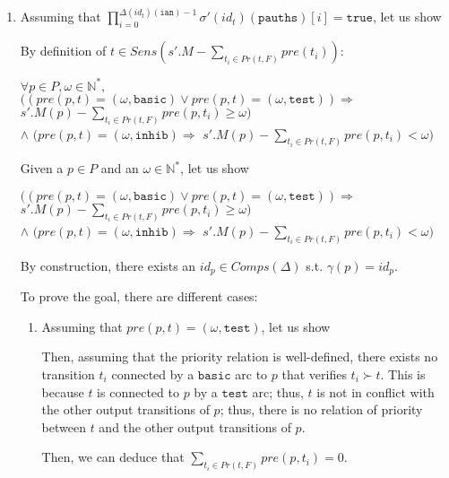 \documentclass[dvipsnames,12pt]{article}
\begin{document}
\begin{niproof}
\begin{enumerate}
  \item Assuming that
    $\prod\limits_{i=0}^{\Delta(id_t)(\texttt{ian})-1}\sigma'(id_t)(\texttt{pauths})[i]=\mathtt{true}$,
    let us show\\
    
    By definition of $t\in{}Sens(s'.M-\sum\limits_{t_i\in{}Pr(t,F)}pre(t_i))$:

    \begin{frameb}
      $\forall{}p\in{}P,\omega\in\mathbb{N}^{*},~$\\
      $\big((pre(p,t)=(\omega,\mathtt{basic})\lor{}pre(p,t)=(\omega,\mathtt{test}))\Rightarrow$
      ${}s'.M(p)-\sum\limits_{t_i\in{}Pr(t,F)}pre(p,t_i)\ge\omega\big)$\\
      $\land{}$ $\big(pre(p,t)=(\omega,\mathtt{inhib})\Rightarrow$
      ${}s'.M(p)-\sum\limits_{t_i\in{}Pr(t,F)}pre(p,t_i)<\omega\big)$
    \end{frameb}

    Given a $p\in{}P$ and an $\omega\in{}\mathbb{N}^{*}$, let us show 
    \begin{frameb}
      $\big((pre(p,t)=(\omega,\mathtt{basic})\lor{}pre(p,t)=(\omega,\mathtt{test}))\Rightarrow$
      ${}s'.M(p)-\sum\limits_{t_i\in{}Pr(t,F)}pre(p,t_i)\ge\omega\big)$\\
      $\land{}$ $\big(pre(p,t)=(\omega,\mathtt{inhib})\Rightarrow$
      ${}s'.M(p)-\sum\limits_{t_i\in{}Pr(t,F)}pre(p,t_i)<\omega\big)$
    \end{frameb}

    By construction, there exists an $id_p\in{}Comps(\Delta)$
    s.t. $\gamma(p)=id_p$. \exP{}
    
    To prove the goal, there are different cases:
    \begin{enumerate}
    \item Assuming that $pre(p,t)=(\omega,\mathtt{test})$, let us show

      Then, assuming that the priority relation is well-defined, there
      exists no transition $t_i$ connected by a $\mathtt{basic}$ arc
      to $p$ that verifies $t_i\succ{}t$. This is because $t$ is
      connected to $p$ by a $\mathtt{test}$ arc; thus, $t$ is not in
      conflict with the other output transitions of $p$; thus, there
      is no relation of priority between $t$ and the other output
      transitions of $p$.

      Then, we can deduce that
      $\sum\limits_{t_i\in{}Pr(t,F)}pre(p,t_i)=0$.


\end{enumerate}
\end{enumerate}
\end{niproof}
\end{document}
